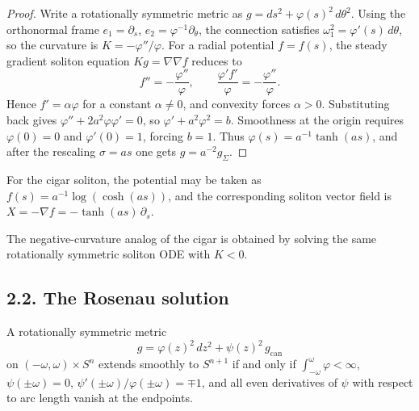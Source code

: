 \begin{proof}
Write a rotationally symmetric metric as \(g=ds^2+\varphi(s)^2\,d\theta^2\).
Using the orthonormal frame \(e_1=\partial_s\), \(e_2=\varphi^{-1}\partial_\theta\),
the connection satisfies \(\omega^2_1=\varphi'(s)\,d\theta\), so the curvature is
\(K=-\varphi''/\varphi\). For a radial potential \(f=f(s)\), the steady gradient
soliton equation \(Kg=\nabla\nabla f\) reduces to
\[
f''=-\frac{\varphi''}{\varphi},\qquad
\frac{\varphi' f'}{\varphi}=-\frac{\varphi''}{\varphi}.
\]
Hence \(f'=\alpha\varphi\) for a constant \(\alpha\neq 0\), and convexity forces
\(\alpha>0\). Substituting back gives \(\varphi''+2a^2\varphi\varphi'=0\), so
\(\varphi'+a^2\varphi^2=b\). Smoothness at the origin requires
\(\varphi(0)=0\) and \(\varphi'(0)=1\), forcing \(b=1\). Thus
\(\varphi(s)=a^{-1}\tanh(as)\), and after the rescaling \(\sigma=as\) one gets
\(g=a^{-2}g_\Sigma\).
\end{proof}

\begin{remark}
\label{ch02-rem-cigars-potential}
For the cigar soliton, the potential may be taken as
\(f(s)=a^{-1}\log(\cosh(as))\), and the corresponding soliton vector field is
\(X=-\nabla f=-\tanh(as)\,\partial_s\).
\end{remark}

\begin{remark}
\label{ch02-rem-cigar-negative-curvature-exercise}
The negative-curvature analog of the cigar is obtained by solving the same
rotationally symmetric soliton ODE with \(K<0\).
\end{remark}

\subsection*{2.2. The Rosenau solution}

\begin{lemma}
\label{ch02-lem-cylinder-to-sphere}
A rotationally symmetric metric
\[
g=\varphi(z)^2\,dz^2+\psi(z)^2\,g_{\mathrm{can}}
\]
on \((-\omega,\omega)\times S^n\) extends smoothly to \(S^{n+1}\) if and only if
\(\int_{-\omega}^{\omega}\varphi<\infty\), \(\psi(\pm\omega)=0\),
\(\psi'(\pm\omega)/\varphi(\pm\omega)=\mp 1\), and all even derivatives of
\(\psi\) with respect to arc length vanish at the endpoints.
\end{lemma}

